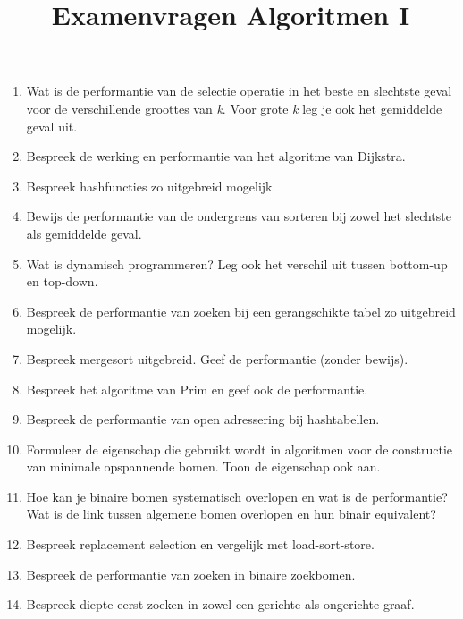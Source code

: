 \documentclass{article}
\title{Examenvragen Algoritmen I}
\date{}
\author{}
\begin{document}
\maketitle
\begin{enumerate}
 \item Wat is de performantie van de selectie operatie in het beste en slechtste geval voor de verschillende groottes van \textit{k}. Voor grote \textit{k} leg je ook het gemiddelde geval uit.
         
 \item Bespreek de werking en performantie van het algoritme van Dijkstra.
         
 \item Bespreek hashfuncties zo uitgebreid mogelijk.

 \item Bewijs de performantie van de ondergrens van sorteren bij zowel het slechtste als gemiddelde geval.
         
 \item Wat is dynamisch programmeren? Leg ook het verschil uit tussen bottom-up en top-down.
         
 \item Bespreek de performantie van zoeken bij een gerangschikte tabel zo uitgebreid mogelijk.

 \item Bespreek mergesort uitgebreid. Geef de performantie (zonder bewijs).
 
 \item Bespreek het algoritme van Prim en geef ook de performantie.
 
 \item Bespreek de performantie van open adressering bij hashtabellen.
 
 \item Formuleer de eigenschap die gebruikt wordt in algoritmen voor de constructie van minimale opspannende bomen. Toon de eigenschap ook aan.
 
 \item Hoe kan je binaire bomen systematisch overlopen en  wat is de performantie? Wat is de link tussen algemene bomen overlopen en hun binair equivalent?
 
 \item Bespreek replacement selection en vergelijk met load-sort-store.
 
 \item Bespreek de performantie van zoeken in binaire zoekbomen.
 
 \item Bespreek diepte-eerst zoeken in zowel een gerichte als ongerichte graaf.
 

\end{enumerate}
\end{document}
